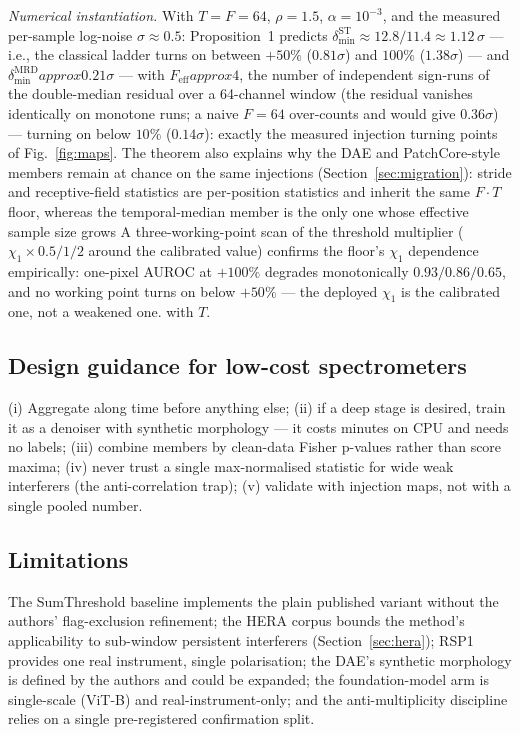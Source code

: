\documentclass[journal]{IEEEtran}
\begin{document}
\emph{Numerical instantiation.}  With $T{=}F{=}64$, $\rho{=}1.5$,
$\alpha{=}10^{-3}$, and the measured per-sample log-noise
$\sigma\!\approx\!0.5$: Proposition~1 predicts
$\delta^{\mathrm{ST}}_{\min}\!\approx\!12.8/11.4\!\approx\!1.12\,\sigma$
--- i.e., the classical ladder turns on between $+50\%$ ($0.81\sigma$) and
$100\%$ ($1.38\sigma$) --- and
$\delta^{\mathrm{MRD}}_{\min}\!approx\!0.21\sigma$ --- with
$F_{\mathrm{eff}}\!approx\!4$, the number of independent sign-runs of the
double-median residual over a 64-channel window (the residual vanishes
identically on monotone runs; a naive $F{=}64$ over-counts and would give
$0.36\sigma$) --- turning on below
$10\%$ ($0.14\sigma$): exactly the measured injection turning points of
Fig.~\ref{fig:maps}.  The theorem also explains why the DAE and
PatchCore-style members remain at chance on the same injections
(Section~\ref{sec:migration}): stride and receptive-field statistics are
per-position statistics and inherit the same $F\cdot T$ floor, whereas the
temporal-median member is the only one whose effective sample size grows
A three-working-point scan of the threshold multiplier ($\chi_1\times0.5/1/2$ around the calibrated value) confirms the floor's $\chi_1$ dependence empirically: one-pixel AUROC at $+100\%$ degrades monotonically $0.93/0.86/0.65$, and no working point turns on below $+50\%$ --- the deployed $\chi_1$ is the calibrated one, not a weakened one.
with $T$.

\subsection{Design guidance for low-cost spectrometers}
(i) Aggregate along time before anything else; (ii) if a deep stage is
desired, train it as a denoiser with synthetic morphology --- it costs
minutes on CPU and needs no labels; (iii) combine members by clean-data
Fisher p-values rather than score maxima; (iv) never trust a single
max-normalised statistic for wide weak interferers (the anti-correlation
trap); (v) validate with injection maps, not with a single pooled number.

\subsection{Limitations}
The SumThreshold baseline implements the plain published variant without the
authors' flag-exclusion refinement; the HERA corpus bounds the method's
applicability to sub-window persistent interferers
(Section~\ref{sec:hera}); RSP1 provides one real instrument, single
polarisation; the DAE's synthetic morphology is defined by the authors and
could be expanded; the foundation-model arm is single-scale (ViT-B) and
real-instrument-only; and the anti-multiplicity discipline relies on a single
pre-registered confirmation split.
\end{document}
